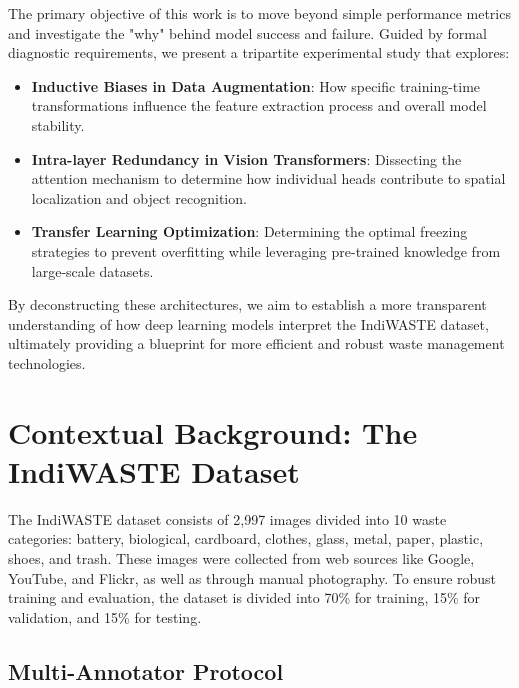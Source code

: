 \documentclass[12pt,a4paper]{article}
\begin{document}
\vspace{1em}

The primary objective of this work is to move beyond simple performance metrics and investigate the "why" behind model success and failure. Guided by formal diagnostic requirements, we present a tripartite experimental study that explores:

\begin{itemize}
    \item \textbf{Inductive Biases in Data Augmentation}: How specific training-time transformations influence the feature extraction process and overall model stability.
    \item \textbf{Intra-layer Redundancy in Vision Transformers}: Dissecting the attention mechanism to determine how individual heads contribute to spatial localization and object recognition.
    \item \textbf{Transfer Learning Optimization}: Determining the optimal freezing strategies to prevent overfitting while leveraging pre-trained knowledge from large-scale datasets.
\end{itemize}

By deconstructing these architectures, we aim to establish a more transparent understanding of how deep learning models interpret the IndiWASTE dataset, ultimately providing a blueprint for more efficient and robust waste management technologies.

\vspace{1.5em}

\section{Contextual Background: The IndiWASTE Dataset}

The IndiWASTE dataset consists of 2,997 images divided into 10 waste categories: battery, biological, cardboard, clothes, glass, metal, paper, plastic, shoes, and trash. These images were collected from web sources like Google, YouTube, and Flickr, as well as through manual photography. To ensure robust training and evaluation, the dataset is divided into 70\% for training, 15\% for validation, and 15\% for testing.

\vspace{1.5em} %

\subsection{Multi-Annotator Protocol}
\end{document}
